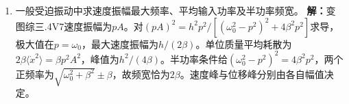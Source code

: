 \documentclass[UTF8,fontset=fandol,a4paper,11pt]{ctexart}
\begin{document}
\begin{enumerate}
\item 一般受迫振动中求速度振幅最大频率、平均输入功率及半功率频宽。
\textbf{解：}变图综三.4V7速度振幅为$pA$。对$(pA)^2=h^2p^2/[(\omega_0^2-p^2)^2+4\beta^2p^2]$求导，极大值在$p=\omega_0$，最大速度振幅为$h/(2\beta)$。单位质量平均耗散为$2\beta\langle\dot x^2\rangle=\beta p^2A^2$，峰值为$h^2/(4\beta)$。半功率条件给$(\omega_0^2-p^2)^2=4\beta^2p^2$，两个正频率为$\sqrt{\omega_0^2+\beta^2}\pm\beta$，故频宽恰为$2\beta$。速度峰与位移峰分别由各自幅值决定。
\begin{center}\begin{minipage}{.98\linewidth}\centering
{}
\end{minipage}
\end{center}
\end{enumerate}
\end{document}
